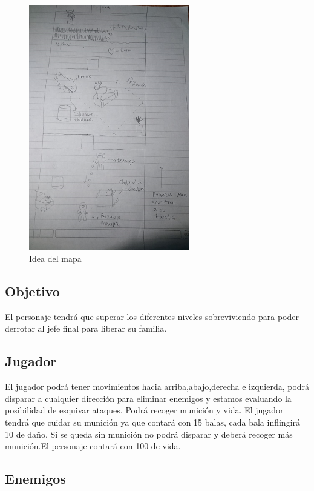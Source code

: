 \documentclass{article}
\begin{document}
\begin{figure}[ht]
\includegraphics[width=7cm]{juego.png}
\centering
\caption{Idea del mapa}
\label{fig:juego}
\end{figure}

\subsection{Objetivo}
El personaje tendrá que superar  los diferentes niveles sobreviviendo para poder derrotar al jefe final para liberar su familia.

\subsection{Jugador}
El jugador podrá tener movimientos hacia arriba,abajo,derecha e izquierda, podrá disparar a cualquier dirección para eliminar enemigos y estamos evaluando la posibilidad de esquivar ataques.
Podrá recoger munición y vida. El jugador tendrá que cuidar su munición ya que contará con 15 balas, cada bala inflingirá 10 de daño. Si se queda sin munición no podrá disparar y deberá recoger más munición.El personaje contará con 100 de vida.

\subsection{Enemigos}
\end{document}
